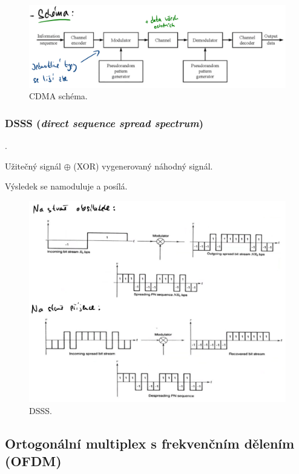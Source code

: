 \begin{figure}[H]
    \centering
    \includegraphics[width=1\linewidth]{cdma.pdf}
    \caption{CDMA schéma.}
\end{figure}

\subsubsection{DSSS (\textit{direct sequence spread spectrum})}

\begin{compactitem}
    \item {}.
    \item Užitečný signál $\oplus$ (XOR) vygenerovaný náhodný signál.
    \item Výsledek se namoduluje a posílá.
\end{compactitem}

\begin{figure}[H]
    \centering
    \includegraphics[width=1\linewidth]{dsss.pdf}
    \caption{DSSS.}
\end{figure}

\subsection{Ortogonální multiplex s frekvenčním dělením (OFDM)}

